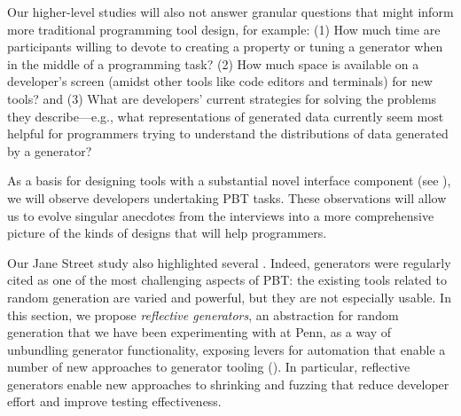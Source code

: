 %
Our higher-level studies will also not answer granular questions that might
inform more traditional programming tool design, for example:
(1) How much time
are participants willing to devote to
creating a property or tuning a generator when in the
middle of a programming task? (2) How much space is available on a developer's
screen (amidst other tools like code editors and terminals) for
new
tools? and (3) What are developers' current strategies for solving the
problems they describe---e.g., what representations of generated data
currently seem most helpful
for programmers trying to understand the distributions of data generated by a
generator?

As a basis for designing tools with a substantial novel interface
component (see ), we will observe developers
undertaking PBT tasks. These observations will allow us to evolve
singular anecdotes from the interviews into a more comprehensive picture of
the kinds of designs that will help programmers.

%
Our Jane Street study also highlighted several .
Indeed, generators were regularly cited as one of the most challenging
aspects of PBT: the existing tools related to random generation are varied
and powerful, but
they are not especially usable.  In this section, we propose {\em reflective
generators}, an abstraction for random generation that we have been
experimenting with at Penn, as a way of unbundling generator
functionality, exposing levers for
automation that enable a number of new approaches to generator
tooling (). In particular, reflective
generators enable new
approaches to shrinking and fuzzing
that reduce developer effort and improve testing
effectiveness.

